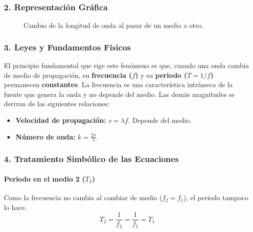 \subsubsection*{2. Representación Gráfica}
\begin{figure}[H]
    \centering
    \caption{Cambio de la longitud de onda al pasar de un medio a otro.}
\end{figure}

\subsubsection*{3. Leyes y Fundamentos Físicos}
El principio fundamental que rige este fenómeno es que, cuando una onda cambia de medio de propagación, su \textbf{frecuencia ($f$)} y su \textbf{periodo ($T=1/f$)} permanecen \textbf{constantes}. La frecuencia es una característica intrínseca de la fuente que genera la onda y no depende del medio.
Las demás magnitudes se derivan de las siguientes relaciones:
\begin{itemize}
    \item \textbf{Velocidad de propagación:} $v = \lambda f$. Depende del medio.
    \item \textbf{Número de onda:} $k = \frac{2\pi}{\lambda}$.
\end{itemize}

\subsubsection*{4. Tratamiento Simbólico de las Ecuaciones}
\paragraph*{Periodo en el medio 2 ($T_2$)}
Como la frecuencia no cambia al cambiar de medio ($f_2=f_1$), el periodo tampoco lo hace.
$$ T_2 = \frac{1}{f_2} = \frac{1}{f_1} = T_1 $$

